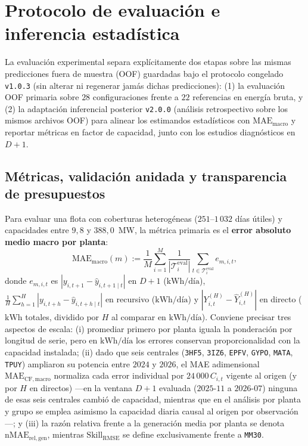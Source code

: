 \section{Protocolo de evaluación e inferencia estadística}\label{sec:inferencia}

La evaluación experimental separa explícitamente dos etapas sobre las mismas predicciones fuera de muestra (OOF) guardadas bajo el protocolo congelado \texttt{v1.0.3} (sin alterar ni regenerar jamás dichas predicciones): (1) la evaluación OOF primaria sobre $28$ configuraciones frente a $22$ referencias en energía bruta, y (2) la adaptación inferencial posterior \texttt{v2.0.0} (análisis retrospectivo sobre los mismos archivos OOF) para alinear los estimandos estadísticos con $\mathrm{MAE}_{\mathrm{macro}}$ y reportar métricas en factor de capacidad, junto con los estudios diagnósticos en $D+1$.

\subsection{Métricas, validación anidada y transparencia de presupuestos}

Para evaluar una flota con coberturas heterogéneas ($251$--$1\,032$ días útiles) y capacidades entre $9{,}8$ y $388{,}0$~MW, la métrica primaria es el \textbf{error absoluto medio macro por planta}:
\begin{equation}
\mathrm{MAE}_{\mathrm{macro}}(m) := \frac{1}{M}\sum_{i=1}^{M}\frac{1}{|\mathcal{T}_i^{\mathrm{eval}}|}\sum_{t \in \mathcal{T}_i^{\mathrm{eval}}} e_{m,i,t},
\label{eq:mae_macro}
\end{equation}
donde $e_{m,i,t}$ es $|y_{i,t+1} - \hat{y}_{i,t+1 \mid t}|$ en $D+1$ ($\text{kWh/día}$), $\frac{1}{H}\sum_{h=1}^{H}|y_{i,t+h} - \hat{y}_{i,t+h \mid t}|$ en recursivo ($\text{kWh/día}$) y $|Y_{i,t}^{(H)} - \hat{Y}_{i,t}^{(H)}|$ en directo ($\text{kWh}$ totales, dividido por $H$ al comparar en $\text{kWh/día}$). Conviene precisar tres aspectos de escala: (i) promediar primero por planta iguala la ponderación por longitud de serie, pero en $\text{kWh/día}$ los errores conservan proporcionalidad con la capacidad instalada; (ii) dado que seis centrales (\texttt{3HF5}, \texttt{3IZ6}, \texttt{EPFV}, \texttt{GYPO}, \texttt{MATA}, \texttt{TPUY}) ampliaron su potencia entre $2024$ y $2026$, el MAE adimensional $\mathrm{MAE}_{\mathrm{CF,macro}}$ normaliza cada error individual por $24\,000\,C_{i,t}$ vigente al origen (y por $H$ en directos) —en la ventana $D+1$ evaluada ($2025$-$11$ a $2026$-$07$) ninguna de esas seis centrales cambió de capacidad, mientras que en el análisis por planta y grupo se emplea asimismo la capacidad diaria causal al origen por observación—; y (iii) la razón relativa frente a la generación media por planta se denota $\mathrm{nMAE}_{\mathrm{rel,gen}}$, mientras $\mathrm{Skill}_{\mathrm{RMSE}}$ se define exclusivamente frente a \texttt{MM30}.

